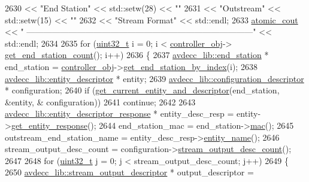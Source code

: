 \begin{DoxyCode}
2630                 << \textcolor{stringliteral}{"End Station"} << std::setw(28) << \textcolor{stringliteral}{""}
2631                 << \textcolor{stringliteral}{"Outstream"} << std::setw(15) << \textcolor{stringliteral}{""}
2632                 << \textcolor{stringliteral}{"Stream Format"} << std::endl;
2633     \hyperlink{cmd__line_8h_a0bc38ccc65c79ba06c6fcd7b4bf554c3}{atomic\_cout} << \textcolor{stringliteral}{"
      ---------------------------------------------------------------------------------"} << std::endl;
2634 
2635     \textcolor{keywordflow}{for} (\hyperlink{parse_8c_a6eb1e68cc391dd753bc8ce896dbb8315}{uint32\_t} i = 0; i < \hyperlink{classcmd__line_af0a7784509e5bf1210a2aa19cea5df70}{controller\_obj}->
      \hyperlink{classavdecc__lib_1_1controller_ab5ddf7b4a9718fe3e821289141f44485}{get\_end\_station\_count}(); i++)
2636     \{
2637         \hyperlink{classavdecc__lib_1_1end__station}{avdecc\_lib::end\_station} * end\_station = 
      \hyperlink{classcmd__line_af0a7784509e5bf1210a2aa19cea5df70}{controller\_obj}->\hyperlink{classavdecc__lib_1_1controller_a2a8ec1205ea0d5fdd6f833285257d0d0}{get\_end\_station\_by\_index}(i);
2638         \hyperlink{classavdecc__lib_1_1entity__descriptor}{avdecc\_lib::entity\_descriptor} * entity;
2639         \hyperlink{classavdecc__lib_1_1configuration__descriptor}{avdecc\_lib::configuration\_descriptor} * configuration;
2640         \textcolor{keywordflow}{if} (\hyperlink{classcmd__line_aa22ed7f036749918eb875043f10060c9}{get\_current\_entity\_and\_descriptor}(end\_station, &entity, &
      configuration))
2641             \textcolor{keywordflow}{continue};
2642 
2643         \hyperlink{classavdecc__lib_1_1entity__descriptor__response}{avdecc\_lib::entity\_descriptor\_response} * entity\_desc\_resp = 
      entity->\hyperlink{classavdecc__lib_1_1entity__descriptor_ac31dd117f0c931ae93c8ba52df7211bd}{get\_entity\_response}();
2644         end\_station\_mac = end\_station->\hyperlink{classavdecc__lib_1_1end__station_a74d2328723e6f5ab7a275e3b0d4cf2a0}{mac}();
2645         outstream\_end\_station\_name = entity\_desc\_resp->\hyperlink{classavdecc__lib_1_1entity__descriptor__response_a3abd11ceacbf37b685377f2b73a502ca}{entity\_name}();
2646         stream\_output\_desc\_count = configuration->\hyperlink{classavdecc__lib_1_1configuration__descriptor_a9ebee6c612e3cfec50f5168790bd265c}{stream\_output\_desc\_count}();
2647 
2648         \textcolor{keywordflow}{for} (\hyperlink{parse_8c_a6eb1e68cc391dd753bc8ce896dbb8315}{uint32\_t} j = 0; j < stream\_output\_desc\_count; j++)
2649         \{
2650             \hyperlink{classavdecc__lib_1_1stream__output__descriptor}{avdecc\_lib::stream\_output\_descriptor} * output\_descriptor = 

\end{DoxyCode}
